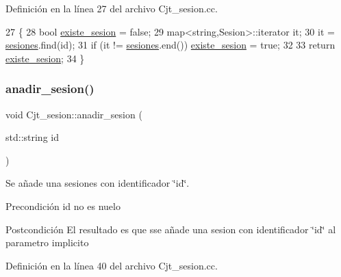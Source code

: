 Definición en la línea 27 del archivo Cjt\+\_\+sesion.\+cc.


\begin{DoxyCode}
27                                         \{
28     \textcolor{keywordtype}{bool} \mbox{\hyperlink{class_cjt__sesion_a405ed3806e378d1a415588e640584bbd}{existe\_sesion}} = \textcolor{keyword}{false};
29     map<string,Sesion>::iterator it;
30     it = \mbox{\hyperlink{class_cjt__sesion_abac1c2ee3cccc598a8274c7da869aa9b}{sesiones}}.find(\textcolor{keywordtype}{id});
31     \textcolor{keywordflow}{if} (it != \mbox{\hyperlink{class_cjt__sesion_abac1c2ee3cccc598a8274c7da869aa9b}{sesiones}}.end()) \mbox{\hyperlink{class_cjt__sesion_a405ed3806e378d1a415588e640584bbd}{existe\_sesion}} = \textcolor{keyword}{true};
32 
33     \textcolor{keywordflow}{return} \mbox{\hyperlink{class_cjt__sesion_a405ed3806e378d1a415588e640584bbd}{existe\_sesion}};
34 \}
\end{DoxyCode}
\mbox{\label{class_cjt__sesion_ace504b799e2c370749ccb16f9312fa5f}} 
\subsubsection{\texorpdfstring{anadir\+\_\+sesion()}{anadir\_sesion()}}
{\footnotesize\ttfamily void Cjt\+\_\+sesion\+::anadir\+\_\+sesion (\begin{DoxyParamCaption}\item[{std\+::string}]{id }\end{DoxyParamCaption})}



Se añade una sesiones con identificador \char`\"{}id\char`\"{}. 

\begin{DoxyPrecond}{Precondición}
id no es nuelo 
\end{DoxyPrecond}
\begin{DoxyPostcond}{Postcondición}
El resultado es que sse añade una sesion con identificador \char`\"{}id\char`\"{} al parametro implicito 
\end{DoxyPostcond}


Definición en la línea 40 del archivo Cjt\+\_\+sesion.\+cc.


